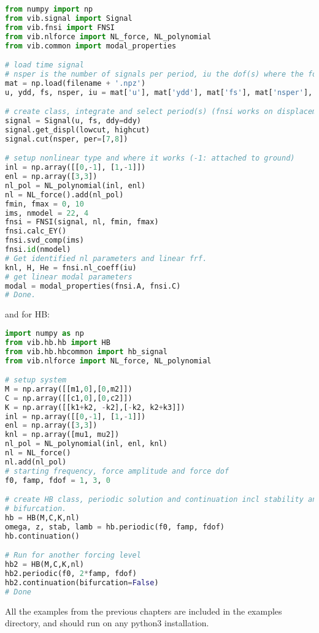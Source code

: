 \begin{lstlisting}[language=Python,frame=single,breaklines=true,basicstyle=\tiny]
from numpy import np
from vib.signal import Signal
from vib.fnsi import FNSI
from vib.nlforce import NL_force, NL_polynomial
from vib.common import modal_properties

# load time signal
# nsper is the number of signals per period, iu the dof(s) where the force(s) works
mat = np.load(filename + '.npz')
u, ydd, fs, nsper, iu = mat['u'], mat['ydd'], mat['fs'], mat['nsper'], mat['iu']

# create class, integrate and select period(s) (fnsi works on displacements)
signal = Signal(u, fs, ddy=ddy)
signal.get_displ(lowcut, highcut)
signal.cut(nsper, per=[7,8])

# setup nonlinear type and where it works (-1: attached to ground)
inl = np.array([[0,-1], [1,-1]])
enl = np.array([3,3])
nl_pol = NL_polynomial(inl, enl)
nl = NL_force().add(nl_pol)
fmin, fmax = 0, 10
ims, nmodel = 22, 4
fnsi = FNSI(signal, nl, fmin, fmax)
fnsi.calc_EY()
fnsi.svd_comp(ims)
fnsi.id(nmodel)
# Get identified nl parameters and linear frf.
knl, H, He = fnsi.nl_coeff(iu)
# get linear modal parameters
modal = modal_properties(fnsi.A, fnsi.C)
# Done.
\end{lstlisting}
and for HB:

\begin{lstlisting}[language=Python,frame=single,breaklines=true,basicstyle=\tiny]
import numpy as np
from vib.hb.hb import HB
from vib.hb.hbcommon import hb_signal
from vib.nlforce import NL_force, NL_polynomial

# setup system
M = np.array([[m1,0],[0,m2]])
C = np.array([[c1,0],[0,c2]])
K = np.array([[k1+k2, -k2],[-k2, k2+k3]])
inl = np.array([[0,-1], [1,-1]])
enl = np.array([3,3])
knl = np.array([mu1, mu2])
nl_pol = NL_polynomial(inl, enl, knl)
nl = NL_force()
nl.add(nl_pol)
# starting frequency, force amplitude and force dof
f0, famp, fdof = 1, 3, 0

# create HB class, periodic solution and continuation incl stability and
# bifurcation.
hb = HB(M,C,K,nl)
omega, z, stab, lamb = hb.periodic(f0, famp, fdof)
hb.continuation()

# Run for another forcing level
hb2 = HB(M,C,K,nl)
hb2.periodic(f0, 2*famp, fdof)
hb2.continuation(bifurcation=False)
# Done
\end{lstlisting}

All the examples from the previous chapters are included in the examples
directory, and should run on any python3 installation.

